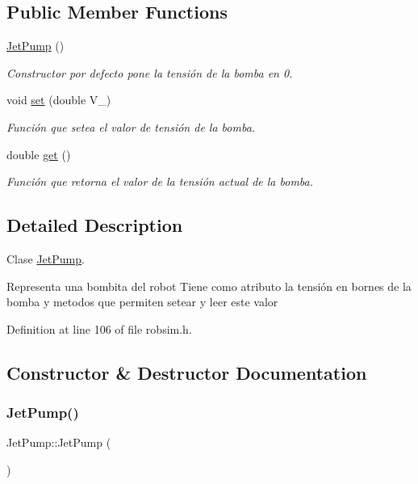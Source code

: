 \subsection*{Public Member Functions}
\begin{DoxyCompactItemize}
\item 
\hyperlink{classJetPump_af259fad2aee62387e353b9911c8bb294}{Jet\+Pump} ()
\begin{DoxyCompactList}\small\item\em Constructor por defecto pone la tensión de la bomba en 0. \end{DoxyCompactList}\item 
void \hyperlink{classJetPump_ab817ef3e43d409ffbce2b72583866000}{set} (double V\+\_\+)
\begin{DoxyCompactList}\small\item\em Función que setea el valor de tensión de la bomba. \end{DoxyCompactList}\item 
double \hyperlink{classJetPump_adb125b513288b6783cc27fce155a6cb5}{get} ()
\begin{DoxyCompactList}\small\item\em Función que retorna el valor de la tensión actual de la bomba. \end{DoxyCompactList}\end{DoxyCompactItemize}


\subsection{Detailed Description}
Clase \hyperlink{classJetPump}{Jet\+Pump}. 

Representa una bombita del robot Tiene como atributo la tensión en bornes de la bomba y metodos que permiten setear y leer este valor 

Definition at line 106 of file robsim.\+h.



\subsection{Constructor \& Destructor Documentation}
\mbox{\label{classJetPump_af259fad2aee62387e353b9911c8bb294}} 
\subsubsection{\texorpdfstring{Jet\+Pump()}{JetPump()}}
{\footnotesize\ttfamily Jet\+Pump\+::\+Jet\+Pump (\begin{DoxyParamCaption}{ }\end{DoxyParamCaption})\hspace{0.3cm}{\ttfamily [inline]}}



